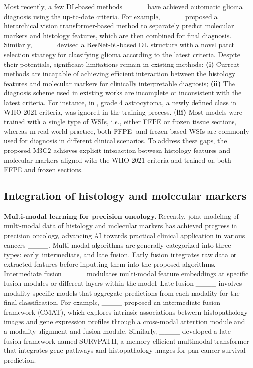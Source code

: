 Most recently, a few DL-based methods ____ have achieved automatic glioma diagnosis using the up-to-date criteria. For example, ____ proposed a hierarchical vision transformer-based method to separately predict molecular markers and histology features, which are then combined for final diagnosis. Similarly, ____ devised a ResNet-50-based DL structure with a novel patch selection strategy for classifying glioma according to the latest criteria. Despite their potentials, significant limitations remain in existing methods: \textbf{(i)} Current methods are incapable of achieving efficient interaction between the histology features and molecular markers for clinically interpretable diagnosis; \textbf{(ii)} The diagnosis scheme used in existing works are incomplete or inconsistent with the latest criteria. For instance, in \citep {hollon2023artificial}, grade 4 astrocytoma, a newly defined class in WHO 2021 criteria, was ignored in the training process. 
\textbf{(iii)} Most models were trained with a single type of WSIs, i.e., either FFPE or frozen tissue sections, whereas in real-world practice, both FFPE- and   frozen-based WSIs are commonly used for diagnosis in different clinical scenarios. To address these gaps, the proposed M3C2 achieves explicit interaction between histology features and molecular markers aligned with the WHO 2021 criteria and trained on both FFPE and frozen sections.



\vspace{-.5em}
\subsection{Integration of histology and molecular markers}


\noindent\textbf{Multi-modal learning for precision oncology.}
Recently, joint modeling of multi-modal data of histology and molecular markers has achieved progress in precision oncology, advancing AI towards practical clinical application in various cancers ____.
Multi-modal algorithms are generally categorized into three types: early, intermediate, and late fusion. Early fusion integrates raw data or extracted features before inputting them into the proposed algorithms. Intermediate fusion ____ modulates multi-modal feature embeddings at specific fusion modules or different layers within the model. Late fusion ____ involves modality-specific models that aggregate predictions from each modality for the final classification. For example, ____ proposed an intermediate fusion framework (CMAT), which explores intrinsic associations between histopathology images and gene expression profiles through a cross-modal attention module and a modality alignment and fusion module. Similarly,  ____ developed a late fusion framework named SURVPATH, a memory-efficient multimodal transformer that integrates gene pathways and histopathology images for pan-cancer survival prediction.



